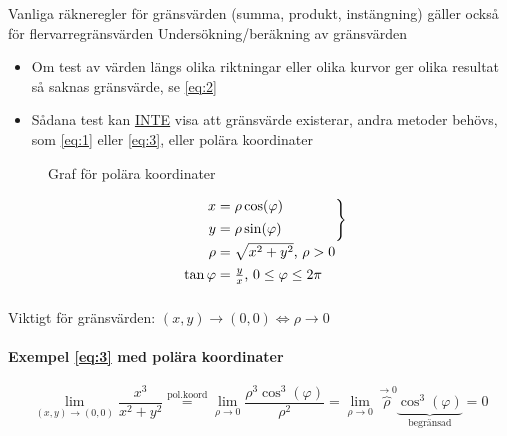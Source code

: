 \documentclass{article}
\begin{document}
Vanliga räkneregler för gränsvärden (summa, produkt, instängning) gäller också för flervarregränsvärden
Undersökning/beräkning av gränsvärden

\begin{itemize}
\item Om test av värden längs olika riktningar eller olika kurvor ger olika resultat så saknas gränsvärde, se \eqref{eq:2}
\item Sådana test kan \underline{INTE} visa att gränsvärde existerar, andra metoder behövs, som \eqref{eq:1} eller \eqref{eq:3}, eller polära koordinater
\end{itemize}

\begin{figure}[ht] 
  \caption{Graf för polära koordinater} \label{fig:2}
\end{figure}

\[
	\def\arraystretch{1.1}
	\begin{blockarray}{r@{\;}l}
	\begin{block}{r@{\;}l\}}
		x & = \rho \cos(\varphi) \\[\jot]
		y & = \rho \sin(\varphi) \\[\jot]
	\end{block}
	\rho  & = \sqrt{x^2+y^2} \text{, } \rho > 0 \\ [\jot]
	\tan{\varphi} & = \frac{y}{x} \text{, } 0 \leq \varphi \leq 2\pi
	\end{blockarray}
\]
Viktigt för gränsvärden: \( (x,y) \rightarrow (0,0) \iff \rho \rightarrow 0 \)

\newpage

\paragraph{Exempel \eqref{eq:3} med polära koordinater}

\[
	\lim_{(x,y) \rightarrow (0,0)} \frac{x^3}{x^2+y^2} \overset{\mathrm{pol.koord}}{=} \lim_{\rho \rightarrow 0} \frac{\rho^3\cos^3(\varphi)}{\rho^2} = \lim_{\rho \rightarrow 0} \overbrace{\rho}^{\rightarrow 0}\underbrace{\cos^3(\varphi)}_\text{begränsad} = 0
\]
\end{document}
